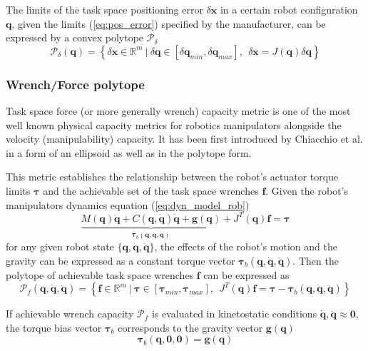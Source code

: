 The limits of the task space positioning error $\delta \bm{x}$ in a certain robot configuration $\bm{q}$, given the limits (\ref{eq:pos_error}) specified by the manufacturer, can be expressed by a convex polytope $\mathcal{P}_\delta$
\begin{equation}
    \mathcal{P}_\delta(\bm{q}) = \left\{ \delta \bm{x} \in \mathbb{R}^m ~|~ \delta  {\bm{q}}\in\left[ \delta {\bm{q}}_{min}, \delta {\bm{q}}_{max} \right], ~~  \delta  {\bm{x}} = J(\bm{q}) \delta {\bm{q}} \right\}
\end{equation}

\subsubsection{Wrench/Force polytope}
\label{ch:poly_force}
Task space force (or more generally wrench) capacity metric is one of the most well known physical capacity metrics for robotics manipulators alongside the velocity (manipulability) capacity. It has been first introduced by Chiacchio et al. \cite{chiacchio_evaluation_1996} in a form of an ellipsoid as well as in the polytope form.

This metric establishes the relationship between the robot's actuator torque limits $\bm{\tau}$ and the achievable set of the task space wrenches $\bm{f}$.
Given the robot's manipulators dynamics equation (\ref{eq:dyn_model_rob}) 
\begin{equation}
\underbrace{M(\bm{q})\ddot{\bm{q}} + C(\bm{q},\dot{\bm{q}})\dot{\bm{q}} + \bm{g}(\bm{q})}_{\bm{\tau}_b(\bm{q},\dot{\bm{q}},\ddot{\bm{q}})} + J^T(\bm{q})\bm{f} = \bm{\tau} 
\end{equation}
for any given robot state $\{\bm{q},\dot{\bm{q}},\ddot{\bm{q}}\}$, the effects of the robot's motion and the gravity can be expressed as a constant torque vector $\bm{\tau}_b(\bm{q},\dot{\bm{q}},\ddot{\bm{q}})$. Then the polytope of achievable task space wrenches $\bm{f}$ can be expressed as
\begin{equation}
    \mathcal{P}_f(\bm{q},\dot{\bm{q}},\ddot{\bm{q}}) = \left\{ \bm{f} \in \mathbb{R}^m ~|~ \bm{\tau}\in\left[\bm{\tau}_{min}, \bm{\tau}_{max} \right], ~~ J^T(\bm{q})\bm{f} = \bm{\tau} -\bm{\tau}_b(\bm{q},\dot{\bm{q}},\ddot{\bm{q}}) \right\}
    \label{eq:poly_force_rob}
\end{equation}

If achievable wrench capacity $\mathcal{P}_f$ is evaluated in kinetostatic conditions $\dot{\bm{q}},\ddot{\bm{q}}\approx\bm{0}$, the torque bias vector $\bm{\tau}_b$ corresponds to the gravity vector $\bm{g}(\bm{q})$ 
\begin{equation}
    \bm{\tau}_b(\bm{q},\bm{0},\bm{0}) = \bm{g}(\bm{q})
\end{equation}


